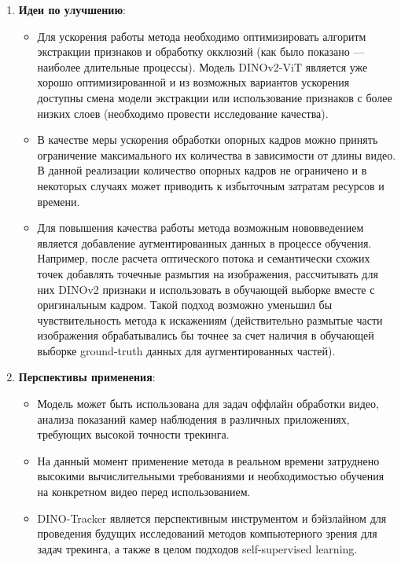 \documentclass[a4paper, 14pt]{extarticle}
\theoremstyle{definition}
\theoremstyle{plain}
\theoremstyle{remark}
\begin{document}
\begin{enumerate}
    \item \textbf{Идеи по улучшению}:
    \begin{itemize}
        \item Для ускорения работы метода необходимо оптимизировать алгоритм экстракции признаков и обработку окклюзий (как было показано --- наиболее длительные процессы). Модель DINOv2-ViT является уже хорошо оптимизированной и из возможных вариантов ускорения доступны смена модели экстракции или использование признаков с более низких слоев (необходимо провести исследование качества). 
        \item В качестве меры ускорения обработки опорных кадров можно принять ограничение максимального их количества в зависимости от длины видео. В данной реализации количество опорных кадров не ограничено и в некоторых случаях может приводить к избыточным затратам ресурсов и времени.
        \item Для повышения качества работы метода возможным нововведением является добавление аугментированных данных в процессе обучения. Например, после расчета оптического потока и семантически схожих точек добавлять точечные размытия на изображения, рассчитывать для них DINOv2 признаки и использовать в обучающей выборке вместе с оригинальным кадром. Такой подход возможно уменьшил бы чувствительность метода к искажениям (действительно размытые части изображения обрабатывались бы точнее за счет наличия в обучающей выборке ground-truth данных для аугментированных частей).
    \end{itemize}

    \item \textbf{Перспективы применения}:
    \begin{itemize}
        \item Модель может быть использована для задач оффлайн обработки видео, анализа показаний камер наблюдения в различных приложениях, требующих высокой точности трекинга.
        \item На данный момент применение метода в реальном времени затруднено высокими вычислительными требованиями и необходимостью обучения на конкретном видео перед использованием. 
        \item DINO-Tracker является перспективным инструментом и бэйзлайном для проведения будущих исследований методов компьютерного зрения для задач трекинга, а также в целом подходов self-supervised learning.
    \end{itemize}
\end{enumerate}

\newpage
\end{document}
